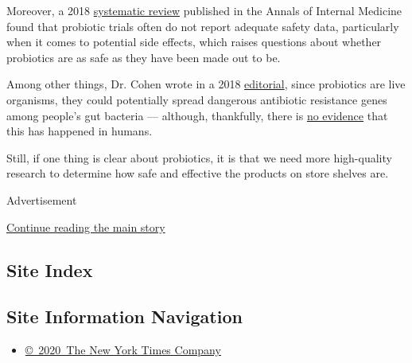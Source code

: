 Moreover, a 2018
\href{https://www.ncbi.nlm.nih.gov/pubmed/30014150}{systematic review}
published in the Annals of Internal Medicine found that probiotic trials
often do not report adequate safety data, particularly when it comes to
potential side effects, which raises questions about whether probiotics
are as safe as they have been made out to be.

Among other things, Dr. Cohen wrote in a 2018
\href{https://jamanetwork.com/journals/jamainternalmedicine/article-abstract/2702973}{editorial},
since probiotics are live organisms, they could potentially spread
dangerous antibiotic resistance genes among people's gut bacteria ---
although, thankfully, there is
\href{https://www.ncbi.nlm.nih.gov/pubmed/19997864}{no evidence} that
this has happened in humans.

Still, if one thing is clear about probiotics, it is that we need more
high-quality research to determine how safe and effective the products
on store shelves are.

Advertisement

\protect\hyperlink{after-bottom}{Continue reading the main story}

\hypertarget{site-index}{%
\subsection{Site Index}\label{site-index}}

\hypertarget{site-information-navigation}{%
\subsection{Site Information
Navigation}\label{site-information-navigation}}

\begin{itemize}
\tightlist
\item
  \href{https://help.nytimes3xbfgragh.onion/hc/en-us/articles/115014792127-Copyright-notice}{©~2020~The
  New York Times Company}
\end{itemize}

